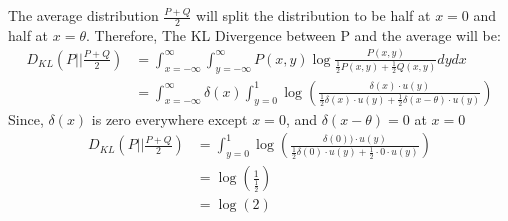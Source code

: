 \documentclass{article}
\begin{document}
\begin{enumerate}[label=\alph*)]
\begin{itemize}
            The average distribution $\frac{P+Q}{2}$ will split the distribution to be half at $x = 0$ and half at $x = \theta$. Therefore, The KL Divergence between
            P and the average will be:
            \begin{equation}
                \begin{aligned}
                    D_{KL}(P||\frac{P+Q}{2}) &= \int_{x=-\infty}^{\infty} \int_{y=-\infty}^{\infty} P(x,y)\log \frac{P(x,y)}{\frac{1}{2}P(x,y)+\frac{1}{2}Q(x,y)}dydx
                    \\ &= \int_{x=-\infty}^{\infty} \delta(x)  \int_{y=0}^{1} \log(\frac{\delta(x)\cdot u(y)}{\frac{1}{2}\delta(x)\cdot u(y)+\frac{1}{2}\delta(x-\theta)\cdot u(y)})
                \end{aligned}
            \end{equation}
            Since, $\delta(x)$ is zero everywhere except $x=0$, and $\delta(x-\theta) = 0$ at $x=0$
            \begin{equation}
                \begin{aligned}
                    D_{KL}(P||\frac{P+Q}{2}) &= \int_{y=0}^{1} \log(\frac{\delta(0))\cdot u(y)}{\frac{1}{2}\delta(0)\cdot u(y)+\frac{1}{2}\cdot0\cdot u(y)})
                    \\  &=  \log(\frac{1}{\frac{1}{2}}) 
                    \\  &= \log(2)
                \end{aligned}
            \end{equation}


\end{itemize}
\end{enumerate}
\end{document}

